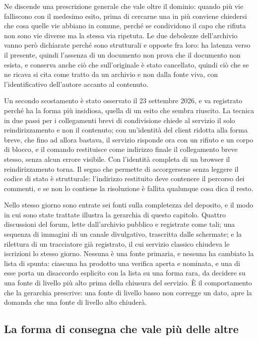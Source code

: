 Ne discende una prescrizione generale che vale oltre il dominio: quando più vie falliscono con il medesimo esito, prima di cercarne una in più conviene chiedersi che cosa quelle vie abbiano in comune, perché se condividono il capo che rifiuta non sono vie diverse ma la stessa via ripetuta. Le due debolezze dell'archivio vanno però dichiarate perché sono strutturali e opposte fra loro: ha latenza verso il presente, quindi l'assenza di un documento non prova che il documento non esista, e conserva anche ciò che sull'originale è stato cancellato, quindi ciò che se ne ricava si cita come tratto da un archivio e non dalla fonte viva, con l'identificativo dell'autore accanto al contenuto.

Un secondo scostamento è stato osservato il 23 settembre 2026, e va registrato perché ha la forma più insidiosa, quella di un esito che sembra riuscito. La tecnica in due passi per i collegamenti brevi di condivisione chiede al servizio il solo reindirizzamento e non il contenuto; con un'identità del client ridotta alla forma breve, che fino ad allora bastava, il servizio risponde ora con un rifiuto e un corpo di blocco, e il comando restituisce come indirizzo finale il collegamento breve stesso, senza alcun errore visibile. Con l'identità completa di un browser il reindirizzamento torna. Il segno che permette di accorgersene senza leggere il codice di stato è strutturale: l'indirizzo restituito deve contenere il percorso dei commenti, e se non lo contiene la risoluzione è fallita qualunque cosa dica il resto.

Nello stesso giorno sono entrate sei fonti sulla completezza del deposito, e il modo in cui sono state trattate illustra la gerarchia di questo capitolo. Quattro discussioni del forum, lette dall'archivio pubblico e registrate come tali; una sequenza di immagini di un canale divulgativo, trascritta dalle schermate; e la rilettura di un tracciatore già registrato, il cui servizio classico chiudeva le iscrizioni lo stesso giorno. Nessuna è una fonte primaria, e nessuna ha cambiato la lista di spunta: ciascuna ha prodotto una verifica aperta e nominata, e una di esse porta un disaccordo esplicito con la lista su una forma rara, da decidere su una fonte di livello più alto prima della chiusura del servizio. È il comportamento che la gerarchia prescrive: una fonte di livello basso non corregge un dato, apre la domanda che una fonte di livello alto chiuderà.

\subsection{La forma di consegna che vale più delle altre}

